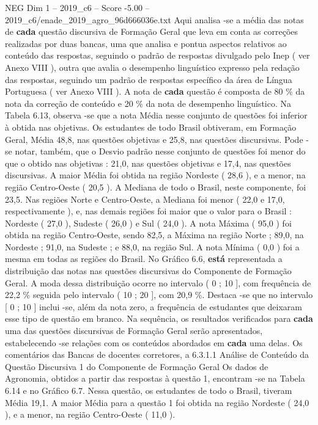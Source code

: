 \begin{textsample}{NEG Dim 1 – 2019\_c6 – Score -5.00 – 2019\_c6/enade\_2019\_agro\_96d666036e.txt}
Aqui analisa -se a média das notas de \textbf{cada} questão discursiva de Formação Geral que leva em conta as correções realizadas por duas bancas, uma que analisa e pontua aspectos relativos ao conteúdo das respostas, seguindo o padrão de respostas divulgado pelo Inep ( ver Anexo VIII ), outra que avalia o desempenho linguístico expresso pela redação das respostas, seguindo um padrão de respostas específico da área de Língua Portuguesa ( ver Anexo VIII ).
A nota de \textbf{cada} questão é composta de 80 \% da nota da correção de conteúdo e 20 \% da nota de desempenho linguístico.
Na Tabela 6.13, observa -se que a nota Média nesse conjunto de questões foi inferior à obtida nas objetivas.
Os estudantes de todo Brasil obtiveram, em Formação Geral, Média 48,8, nas questões objetivas e 25,8, nas questões discursivas.
Pode -se notar, também, que o Desvio padrão nesse conjunto de questões foi menor do que o obtido nas objetivas : 21,0, nas questões objetivas e 17,4, nas questões discursivas.
A maior Média foi obtida na região Nordeste ( 28,6 ), e a menor, na região Centro-Oeste ( 20,5 ).
A Mediana de todo o Brasil, neste componente, foi 23,5.
Nas regiões Norte e Centro-Oeste, a Mediana foi menor ( 22,0 e 17,0, respectivamente ), e, nas demais regiões foi maior que o valor para o Brasil : Nordeste ( 27,0 ), Sudeste ( 26,0 ) e Sul ( 24,0 ).
A nota Máxima ( 95,0 ) foi obtida na região Centro-Oeste, sendo 82,5, a Máxima na região Norte ; 89,0, na Nordeste ; 91,0, na Sudeste ; e 88,0, na região Sul.
A nota Mínima ( 0,0 ) foi a mesma em todas as regiões do Brasil.
No Gráfico 6.6, \textbf{está} representada a distribuição das notas nas questões discursivas do Componente de Formação Geral.
A moda dessa distribuição ocorre no intervalo ( 0 ; 10 ], com frequência de 22,2 \% seguida pelo intervalo ( 10 ; 20 ], com 20,9 \%.
Destaca -se que no intervalo [ 0 ; 10 ] inclui -se, além da nota zero, a frequência de estudantes que deixaram esse tipo de questão em branco.
Na sequência, os resultados verificados para \textbf{cada} uma das questões discursivas de Formação Geral serão apresentados, estabelecendo -se relações com os conteúdos abordados em \textbf{cada} uma delas.
Os comentários das Bancas de docentes corretores, a 6.3.1.1 Análise de Conteúdo da Questão Discursiva 1 do Componente de Formação Geral Os dados de Agronomia, obtidos a partir das respostas à questão 1, encontram -se na Tabela 6.14 e no Gráfico 6.7.
Nessa questão, os estudantes de todo o Brasil, tiveram Média 19,1.
A maior Média para a questão 1 foi obtida na região Nordeste ( 24,0 ), e a menor, na região Centro-Oeste ( 11,0 ).

\end{textsample}
